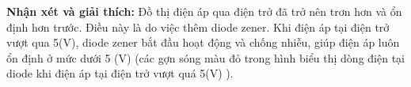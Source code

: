 \textbf{Nhận xét và giải thích:} Đồ thị điện áp qua điện trở đã trở nên trơn hơn và ổn định hơn trước. Điều này là do việc thêm diode zener. Khi điện áp tại điện trở vượt qua 5(V), diode zener bắt đầu hoạt động và chống nhiễu, giúp điện áp luôn ổn định ở mức dưới 5 (V) (các gợn sóng màu đỏ trong hình biểu thị dòng điện tại diode khi điện áp tại điện trở vượt quá 5(V) ).




